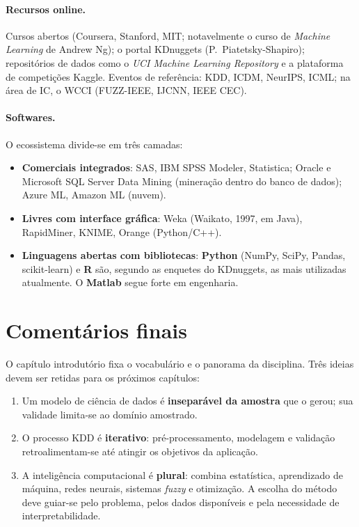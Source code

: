 \paragraph{Recursos online.} Cursos abertos (Coursera, Stanford, MIT;
notavelmente o curso de \emph{Machine Learning} de Andrew Ng); o portal
KDnuggets (P.~Piatetsky-Shapiro); repositórios de dados como o
\emph{UCI Machine Learning Repository} e a plataforma de competições
Kaggle. Eventos de referência: KDD, ICDM, NeurIPS, ICML; na área de IC,
o WCCI (FUZZ-IEEE, IJCNN, IEEE CEC).

\paragraph{Softwares.} O ecossistema divide-se em três camadas:

\begin{itemize}[leftmargin=1.2cm]
  \item \textbf{Comerciais integrados}: SAS, IBM SPSS Modeler, Statistica;
        Oracle e Microsoft SQL Server Data Mining (mineração dentro do
        banco de dados); Azure ML, Amazon ML (nuvem).
  \item \textbf{Livres com interface gráfica}: Weka (Waikato, 1997, em
        Java), RapidMiner, KNIME, Orange (Python/C++).
  \item \textbf{Linguagens abertas com bibliotecas}: \textbf{Python}
        (NumPy, SciPy, Pandas, scikit-learn) e \textbf{R} são, segundo
        as enquetes do KDnuggets, as mais utilizadas atualmente. O
        \textbf{Matlab} segue forte em engenharia.
\end{itemize}

\section{Comentários finais}

O capítulo introdutório fixa o vocabulário e o panorama da disciplina.
Três ideias devem ser retidas para os próximos capítulos:

\begin{enumerate}[leftmargin=1.2cm]
  \item Um modelo de ciência de dados é \textbf{inseparável da
        amostra} que o gerou; sua validade limita-se ao domínio
        amostrado.
  \item O processo KDD é \textbf{iterativo}: pré-processamento,
        modelagem e validação retroalimentam-se até atingir os objetivos
        da aplicação.
  \item A inteligência computacional é \textbf{plural}: combina
        estatística, aprendizado de máquina, redes neurais, sistemas
        \emph{fuzzy} e otimização. A escolha do método deve guiar-se
        pelo problema, pelos dados disponíveis e pela necessidade de
        interpretabilidade.
\end{enumerate}


